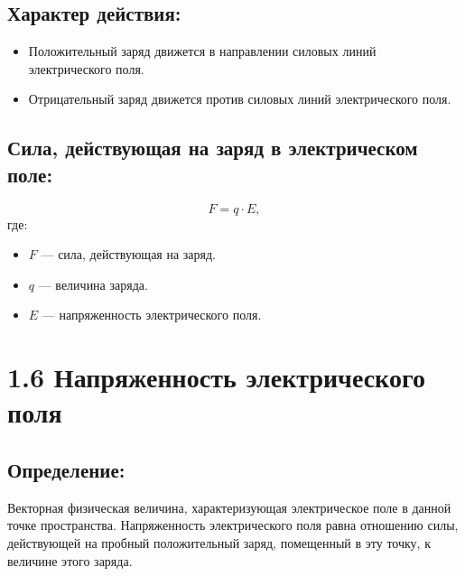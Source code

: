 \documentclass[a4paper,12pt]{article}
\begin{document}
\vspace{-9pt}
\subsection*{Характер действия:}
\vspace{-3pt}
\begin{itemize}
  \item Положительный заряд движется в направлении силовых линий электрического поля.
  \item Отрицательный заряд движется против силовых линий электрического поля.
\end{itemize}

\vspace{-9pt}
\subsection*{Сила, действующая на заряд в электрическом поле:}
\vspace{-3pt}
\vspace{-0.05em}
$$ F = q \cdot E, $$
где:
\begin{itemize}
  \item $F$ — сила, действующая на заряд.
  \item $q$ — величина заряда.
  \item $E$ — напряженность электрического поля.
\end{itemize}

\newpage

\section*{1.6 Напряженность электрического поля}

\vspace{-9pt}
\subsection*{Определение:}
\vspace{-3pt}
Векторная физическая величина, характеризующая электрическое поле в данной точке пространства. Напряженность электрического поля равна отношению силы, действующей на пробный положительный заряд, помещенный в эту точку, к величине этого заряда.

\vspace{-9pt}
\end{document}
